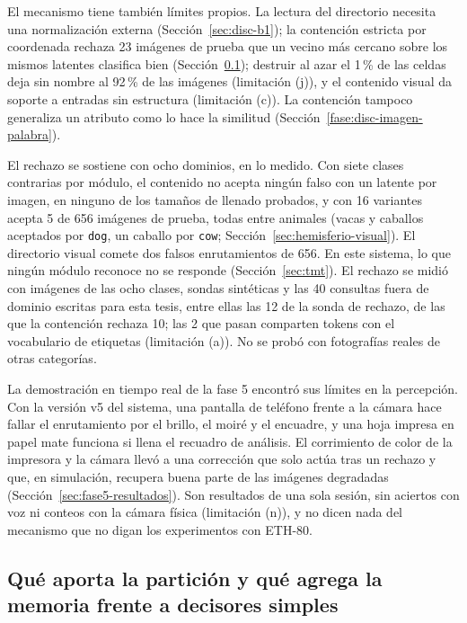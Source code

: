 El mecanismo tiene también límites propios.
La lectura del directorio necesita una normalización externa
(Sección~\ref{sec:disc-b1}); la contención estricta por coordenada rechaza 23 imágenes
de prueba que un vecino más cercano sobre los mismos latentes clasifica bien
(Sección~\ref{sec:disc-lineas-base}); destruir al azar el 1\,\% de las celdas deja sin nombre al 92\,\% de las imágenes
(limitación (j)), y el contenido visual da soporte a entradas sin estructura
(limitación (c)).
La contención tampoco generaliza un atributo como lo hace la similitud
(Sección~\ref{fase:disc-imagen-palabra}).

El rechazo se sostiene con ocho dominios, en lo medido.
Con siete clases contrarias por módulo, el contenido no acepta ningún falso con un
latente por imagen, en ninguno de los tamaños de llenado probados, y con 16
variantes acepta 5 de 656 imágenes de prueba, todas entre animales (vacas y caballos
aceptados por \texttt{dog}, un caballo por \texttt{cow};
Sección~\ref{sec:hemisferio-visual}).
El directorio visual comete dos falsos enrutamientos de 656.
En este sistema, lo que ningún módulo reconoce no se responde
(Sección~\ref{sec:tmt}).
El rechazo se midió con imágenes de las ocho clases, sondas sintéticas y las 40
consultas fuera de dominio escritas para esta tesis, entre ellas las 12 de la sonda
de rechazo, de las que la contención rechaza 10; las 2 que pasan comparten tokens con el
vocabulario de etiquetas (limitación (a)).
No se probó con fotografías reales de otras categorías.

La demostración en tiempo real de la fase 5 encontró sus límites en la percepción.
Con la versión v5 del sistema, una pantalla de teléfono frente a la cámara hace fallar
el enrutamiento por el brillo, el moiré y el encuadre, y una hoja impresa en papel mate
funciona si llena el recuadro de análisis.
El corrimiento de color de la impresora y la cámara llevó a una corrección que solo
actúa tras un rechazo y que, en simulación, recupera buena parte de las imágenes
degradadas (Sección~\ref{sec:fase5-resultados}).
Son resultados de una sola sesión, sin aciertos con voz ni conteos con la cámara física
(limitación (n)), y no dicen nada del mecanismo que no digan los experimentos con
ETH-80.

\subsection{Qué aporta la partición y qué agrega la memoria frente a decisores simples}
\label{sec:disc-lineas-base}

